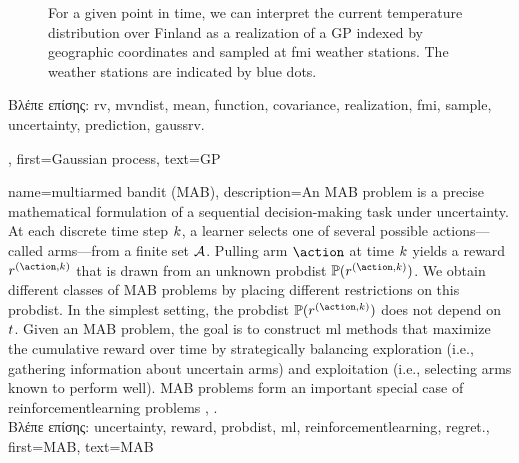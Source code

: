 {{\begin{figure}[H]
\begin{center}
		\vspace*{-15mm}
	\end{center}
	\caption{For a given point in time, we can interpret the current temperature distribution 
	over Finland as a \gls{realization} of a GP indexed by geographic coordinates and 
	sampled at \gls{fmi} weather stations. The weather stations are indicated by blue dots. \label{fig_gp_FMI_dict}}
	\end{figure}
	\foreignlanguage{greek}{Βλέπε επίσης:} \gls{rv}, \gls{mvndist}, \gls{mean}, \gls{function}, \gls{covariance}, \gls{realization}, 
	\gls{fmi}, \gls{sample}, \gls{uncertainty}, \gls{prediction}, \gls{gaussrv}. }, 
  first={Gaussian process}, 
  text={GP}
}

{name={multiarmed bandit (MAB)},
	description={An MAB  problem is a precise mathematical 
		formulation of a sequential decision-making task under \gls{uncertainty}. At each 
		discrete time step $k$, a learner selects one of several possible 
		actions—called arms—from a finite set $\mathcal{A}$. Pulling arm $\action$ at time 
		$k$ yields a \gls{reward} $\reward^{(\action,\iteridx)}$ that is drawn from an unknown 
		\gls{probdist} $\prob{\reward^{(\action,\iteridx)}}$. We obtain different classes 
		of MAB problems by placing different restrictions on this \gls{probdist}. In the simplest 
		setting, the \gls{probdist} $\prob{\reward^{(\action,\iteridx)}}$ does not depend on $t$. 
		Given an MAB problem, the goal is to construct \gls{ml} methods that maximize the cumulative 
		\gls{reward} over time by strategically balancing exploration (i.e., gathering information 
		about uncertain arms) and exploitation (i.e., selecting arms known to perform well). 
		MAB problems form an important special case of \gls{reinforcementlearning} problems \cite{Bubeck2012}, \cite{SuttonEd2}. \\
		\foreignlanguage{greek}{Βλέπε επίσης:} \gls{uncertainty}, \gls{reward}, \gls{probdist}, \gls{ml}, \gls{reinforcementlearning}, \gls{regret}.},
	first={MAB},
	text={MAB}
}

